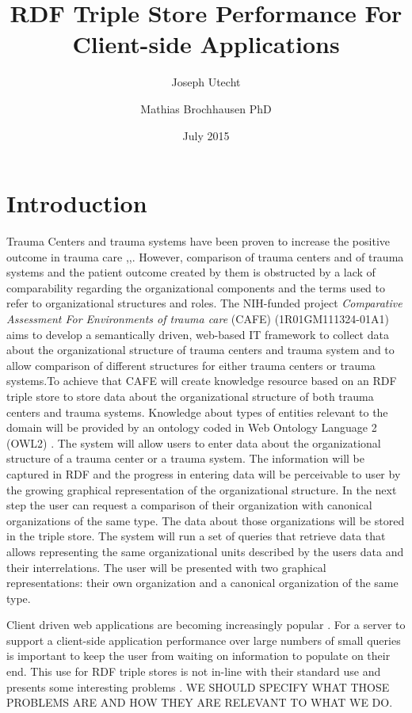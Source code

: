 \documentclass{llncs}
\title{RDF Triple Store Performance For Client-side Applications}
\author{Joseph Utecht \and Mathias Brochhausen PhD}
\institute{Department of Biomedical Informatics, University of Arkansas for Medical Sciences, Little Rock, AR}
\date{July 2015}
\begin{document}
\maketitle
\section{Introduction}

Trauma Centers and trauma systems have been proven to increase the positive outcome in trauma care \cite{pmid16427544},\cite{pmid21206286},\cite{pmid26151508}. However, comparison of trauma centers and of trauma systems and the patient outcome created by them is obstructed by a lack of comparability regarding the organizational components and the terms used to refer to organizational structures and roles. The NIH-funded project \textit{Comparative Assessment For Environments of trauma care} (CAFE) (1R01GM111324-01A1)  aims to develop a semantically driven, web-based IT framework to collect data about the organizational structure of trauma centers and trauma system and to allow comparison of different structures for either trauma centers or trauma systems.To achieve that CAFE will create knowledge resource based on an RDF triple store to store data about the organizational structure of both trauma centers and trauma systems. Knowledge about types of entities relevant to the domain will be provided by an ontology coded in Web Ontology Language 2 (OWL2) \cite{OWL2}. The system will allow users to enter data about the organizational structure of a trauma center or a trauma system. The information will be captured in RDF and the progress in entering data will be perceivable to user by the growing graphical representation of the organizational structure. In the next step the user can request a comparison of their organization with canonical organizations of the same type. The data about those organizations will be stored in the triple store. The system will run a set of queries that retrieve data that allows representing the same organizational units described by the users data and their interrelations. The user will be presented with two graphical representations: their own organization and a canonical organization of the same type.

Client driven web applications are becoming increasingly popular \cite{Fielding2000}.  For a server to support a client-side application performance over large numbers of small queries is important to keep the user from waiting on information to populate on their end.  This use for RDF triple stores is not in-line with their standard use and presents some interesting problems \cite{Battle2008}. WE SHOULD SPECIFY WHAT THOSE PROBLEMS ARE AND HOW THEY ARE RELEVANT TO WHAT WE DO.
\end{document}
